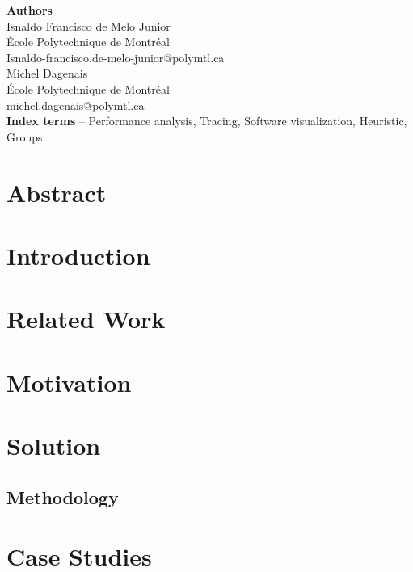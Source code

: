 \label{sec:Theme2}
\textbf{Authors}\\
Isnaldo Francisco de Melo Junior\\
École Polytechnique de Montréal\\
Isnaldo-francisco.de-melo-junior@polymtl.ca\\
 
Michel Dagenais\\
École Polytechnique de Montréal\\
michel.dagenais@polymtl.ca\\
 
\textbf{Index terms} – Performance analysis, Tracing, Software visualization, Heuristic, Groups.\\

\section{Abstract}
\label{sec:abstract}



\section{Introduction}
\label{sec:introduction}

 
\section{Related Work}
\label{sec:related-work}



\section{Motivation}
\label{sec:motivation}


\section{Solution}
\label{sec:solution}


\subsection{Methodology}
\label{sec:methodology}



\section{Case Studies}
\label{sec:usecases}


